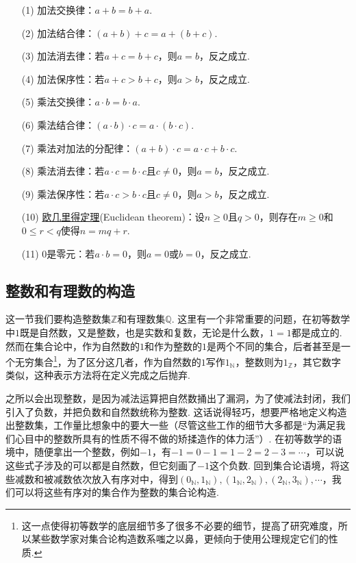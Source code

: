 \documentclass[main.tex]{subfiles}
\begin{document}
\begin{itemize}
    \item [(1)] 加法交换律：\(a+b = b+a\).
    \item [(2)] 加法结合律：\((a+b)+c = a+(b+c)\).
    \item [(3)] 加法消去律：若\(a+c = b+c\)，则\(a=b\)，反之成立.
    \item [(4)] 加法保序性：若\(a+c>b+c\)，则\(a>b\)，反之成立.
    \item [(5)] 乘法交换律：\(a \cdot b = b \cdot a\).
    \item [(6)] 乘法结合律：\((a \cdot b) \cdot c = a \cdot (b \cdot c)\).
    \item [(7)] 乘法对加法的分配律：\((a+b) \cdot c = a \cdot c + b \cdot c\).
    \item [(8)] 乘法消去律：若\(a \cdot c = b \cdot c\)且\(c \neq 0\)，则\(a=b\)，反之成立.
    \item [(9)] 乘法保序性：若\(a \cdot c > b \cdot c\)且\(c \neq 0\)，则\(a>b\)，反之成立.
    \item [(10)] \uline{欧几里得定理}(Euclidean theorem)：设\(n\geq 0\)且\(q >0\)，则存在\(m \geq 0\)和\(0 \leq r < q\)使得\(n = mq+r\).
    \item [(11)] 0是零元：若\(a \cdot b = 0\)，则\(a=0\)或\(b=0\)，反之成立.
\end{itemize}

\subsection{整数和有理数的构造}

这一节我们要构造整数集\(\mathbb{Z}\)和有理数集\(\mathbb{Q}\). 这里有一个非常重要的问题，在初等数学中\(1\)既是自然数，又是整数，也是实数和复数，无论是什么数，\(1=1\)都是成立的. 然而在集合论中，作为自然数的\(1\)和作为整数的\(1\)是两个不同的集合，后者甚至是一个无穷集合\footnote{这一点使得初等数学的底层细节多了很多不必要的细节，提高了研究难度，所以某些数学家对集合论构造数系嗤之以鼻，更倾向于使用公理规定它们的性质.}，为了区分这几者，作为自然数的\(1\)写作\(1_{\mathbb{N}}\)，整数则为\(1_{\mathbb{Z}}\)，其它数字类似，这种表示方法将在定义完成之后抛弃.

之所以会出现整数，是因为减法运算把自然数捅出了漏洞，为了使减法封闭，我们引入了负数，并把负数和自然数统称为整数. 这话说得轻巧，想要严格地定义构造出整数集，工作量比想象中的要大一些（尽管这些工作的细节大多都是“为满足我们心目中的整数所具有的性质不得不做的矫揉造作的体力活”）.
在初等数学的语境中，随便拿出一个整数，例如\(-1\)，有\(-1 = 0-1 = 1-2 = 2-3 = \cdots\)，可以说这些式子涉及的可以都是自然数，但它刻画了\(-1\)这个负数. 回到集合论语境，将这些减数和被减数依次放入有序对中，得到\((0_{\mathbb{N}},1_{\mathbb{N}}),(1_{\mathbb{N}},2_{\mathbb{N}}),(2_{\mathbb{N}},3_{\mathbb{N}}),\cdots\)，我们可以将这些有序对的集合作为整数的集合论构造. 
\end{document}
